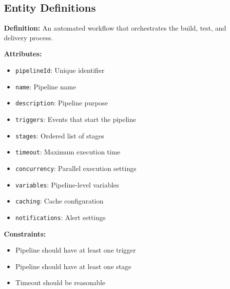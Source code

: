 \documentclass[11pt,letterpaper]{article}
\begin{document}
\subsection{Entity Definitions}

\begin{definitionbox}
\textbf{Definition:} An automated workflow that orchestrates the build, test, and delivery process.

\textbf{Attributes:}
\begin{itemize}[nosep]
    \item \texttt{pipelineId}: Unique identifier
    \item \texttt{name}: Pipeline name
    \item \texttt{description}: Pipeline purpose
    \item \texttt{triggers}: Events that start the pipeline
    \item \texttt{stages}: Ordered list of stages
    \item \texttt{timeout}: Maximum execution time
    \item \texttt{concurrency}: Parallel execution settings
    \item \texttt{variables}: Pipeline-level variables
    \item \texttt{caching}: Cache configuration
    \item \texttt{notifications}: Alert settings
\end{itemize}

\textbf{Constraints:}
\begin{itemize}[nosep]
    \item Pipeline should have at least one trigger
    \item Pipeline should have at least one stage
    \item Timeout should be reasonable
\end{itemize}
\end{definitionbox}
\end{document}
